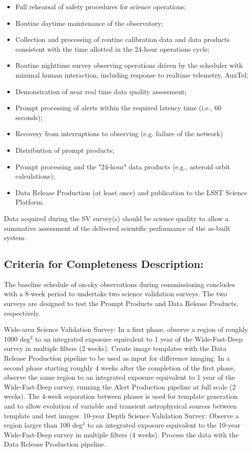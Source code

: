 \begin{itemize}
\item Full rehearsal of safety procedures for science operations;
\item Routine daytime maintenance of the observatory;
\item Collection and processing of routine calibration data and data products consistent with the time allotted in the 24-hour operations cycle;
\item Routine nighttime survey observing operations driven by the scheduler with minimal human interaction, including response to realtime telemetry, AuxTel;
\item Demonstration of near real time data quality assessment;
\item Prompt processing of alerts within the required latency time (i.e., 60 seconds);
\item Recovery from interruptions to observing (e.g. failure of the network)
\item Distribution of prompt products;
\item Prompt processing and the "24-hour" data products (e.g., asteroid orbit calculations);
\item Data Release Production (at least once) and publication to the LSST Science Platform.
\end{itemize}

Data acquired during the SV survey(s) should be science quality to allow a summative assessment of the delivered scientific performance of the as-built system.

\subsection{Criteria for Completeness Description:}

The baseline schedule of on-sky observations during commissioning concludes with a 8-week period to undertake two science validation surveys. The two surveys are designed to test the Prompt Products and Data Release Products, respectively.

    Wide-area Science Validation Survey: In a first phase, observe a region of roughly 1000 deg$^2$ to an integrated exposure equivalent to 1 year of the Wide-Fast-Deep survey in multiple filters (2 weeks). Create image templates with the Data Release Production pipeline to be used as input for difference imaging. In a second phase starting roughly 4 weeks after the completion of the first phase, observe the same region to an integrated exposure equivalent to 1 year of the Wide-Fast-Deep survey, running the Alert Production pipeline at full scale (2 weeks). The 4-week separation between phases is used for template generation and to allow evolution of variable and transient astrophysical sources between template and test images.
    10-year Depth Science Validation Survey: Observe a region larger than 100 deg$^2$ to an integrated exposure equivalent to the 10-year Wide-Fast-Deep survey in multiple filters (4 weeks). Process the data with the Data Release Production pipeline.

